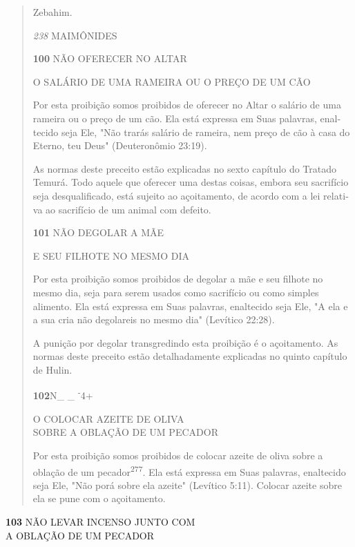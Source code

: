 \begin{quote}
Zebahim.

\emph{238} MAIMÔNIDES

\textbf{100} NÃO OFERECER NO ALTAR

O SALÁRIO DE UMA RAMEIRA OU O PREÇO DE UM CÃO

Por esta proibição somos proibidos de oferecer no Altar o salário de uma
rameira ou o preço de um cão. Ela está expressa em Suas palavras,
enal­tecido seja Ele, "Não trarás salário de rameira, nem preço de cão à
casa do Eter­no, teu Deus" (Deuteronômio 23:19).

As normas deste preceito estão explicadas no sexto capítulo do Tra­tado
Temurá. Todo aquele que oferecer uma destas coisas, embora seu
sacrifí­cio seja desqualificado, está sujeito ao açoitamento, de acordo
com a lei relati­va ao sacrifício de um animal com defeito.

\textbf{101} NÃO DEGOLAR A MÃE

E SEU FILHOTE NO MESMO DIA

Por esta proibição somos proibidos de degolar a mãe e seu filhote no
mesmo dia, seja para serem usados como sacrifício ou como simples
alimento. Ela está expressa em Suas palavras, enaltecido seja Ele, "A
ela e a sua cria não degolareis no mesmo dia" (Levítico 22:28).

A punição por degolar transgredindo esta proibição é o açoitamento. As
normas deste preceito estão detalhadamente explicadas no quin­to
capítulo de Hulin.

\textbf{102}N\_ \_ \textsuperscript{-}4+

O COLOCAR AZEITE DE OLIVA\\
SOBRE A OBLAÇÃO DE UM PECADOR

Por esta proibição somos proibidos de colocar azeite de oliva sobre a
oblação de um pecador\textsuperscript{277}. Ela está expressa em Suas
palavras, enaltecido se­ja Ele, "Não porá sobre ela azeite" (Levítico
5:11). Colocar azeite sobre ela se pune com o açoitamento.
\end{quote}

\textbf{103} NÃO LEVAR INCENSO JUNTO COM\\
A OBLAÇÃO DE UM PECADOR

